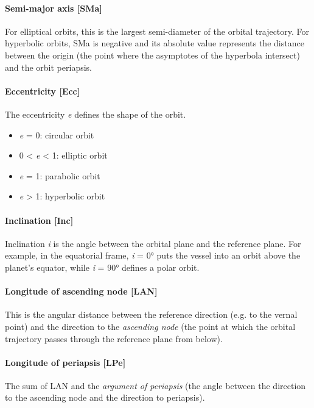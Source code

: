 \documentclass[Orbiter User Manual.tex]{subfiles}
\begin{document}
\paragraph{Semi-major axis [SMa]}
For elliptical orbits, this is the largest semi-diameter of the orbital trajectory. For hyperbolic orbits, SMa is negative and its absolute value represents the distance between the origin (the point where the asymptotes of the hyperbola intersect) and the orbit periapsis.

\paragraph{Eccentricity [Ecc]}
The eccentricity \textit{e} defines the shape of the orbit.

\begin{itemize}
\item \textit{e} = 0: circular orbit
\item 0 < \textit{e} < 1: elliptic orbit
\item \textit{e} = 1: parabolic orbit
\item \textit{e} > 1: hyperbolic orbit
\end{itemize}

\paragraph{Inclination [Inc]}
Inclination \textit{i} is the angle between the orbital plane and the reference plane. For example, in the equatorial frame, \textit{i} = 0° puts the vessel into an orbit above the planet's equator, while \textit{i} = 90° defines a polar orbit.

\paragraph{Longitude of ascending node [LAN]}
This is the angular distance between the reference direction (e.g. to the vernal point) and the direction to the \textit{ascending node} (the point at which the orbital trajectory passes through the reference plane from below).

\paragraph{Longitude of periapsis [LPe]}
The sum of LAN and the \textit{argument of periapsis} (the angle between the direction to the ascending node and the direction to periapsis).
\end{document}
